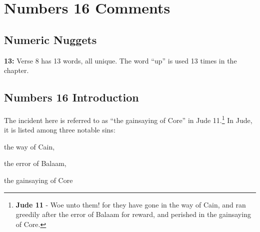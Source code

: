 \section{Numbers 16 Comments}

\subsection{Numeric Nuggets}
\textbf{13: } Verse 8 has 13 words, all unique. The word ``up'' is used 13 times in the chapter.

\subsection{Numbers 16 Introduction}
The incident here is referred to as ``the gainsaying of Core'' in Jude 11.\footnote{\textbf{Jude 11} - Woe unto them! for they have gone in the way of Cain, and ran greedily after the error of Balaam for reward, and perished in the gainsaying of Core.} In Jude, it is listed among three notable sins:\\
\begin{compactenum}
    \item the way of Cain,
    \item the error of Balaam,
    \item the gainsaying of Core
\end{compactenum}